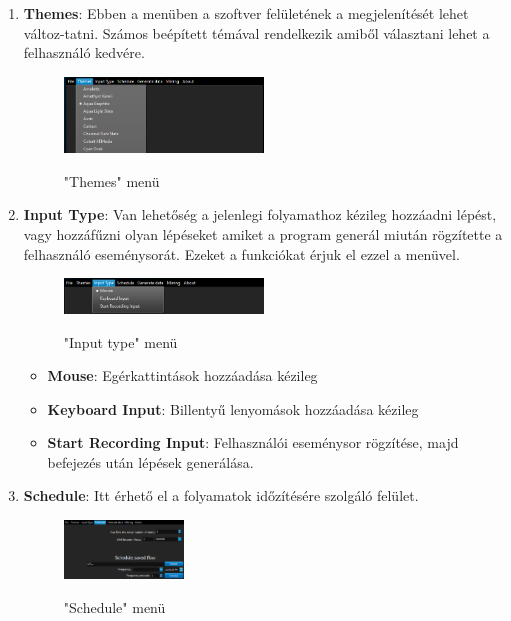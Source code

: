 \begin{enumerate}
{	}
	\item{
		\textbf{Themes}: Ebben a menüben a szoftver felületének a megjelenítését lehet változ\hyp{}tatni. Számos beépített témával rendelkezik amiből választani lehet a felhasználó kedvére.
		\begin{figure}[h]
			\begin{center}
				\caption{"Themes" menü}
				\includegraphics[width=0.5\textwidth, keepaspectratio=true]{images/img_ui_themes}\\
				\label{fig:example}
			\end{center}
		\end{figure}
	}
	\item{
		\textbf{Input Type}: Van lehetőség a jelenlegi folyamathoz kézileg hozzáadni lépést, vagy hozzáfűzni olyan lépéseket amiket a program generál miután rögzítette a felhasználó eseménysorát. Ezeket a funkciókat érjuk el ezzel a menüvel.
		\begin{figure}[h]
			\begin{center}
				\caption{"Input type" menü}
				\includegraphics[width=0.5\textwidth, keepaspectratio=true]{images/img_ui_input}\\
				\label{fig:example}
			\end{center}
		\end{figure}
		\begin{itemize}
			\item{\textbf{Mouse}: Egérkattintások hozzáadása kézileg}
			\item{\textbf{Keyboard Input}: Billentyű lenyomások hozzáadása kézileg}
			\item{\textbf{Start Recording Input}: Felhasználói eseménysor rögzítése, majd befejezés után lépések generálása.}
		\end{itemize}
	}
	\item{
		\textbf{Schedule}: Itt érhető el a folyamatok időzítésére szolgáló felület.
		\begin{figure}[h!]
			\begin{center}
				\caption{"Schedule" menü}
				\includegraphics[width=0.3\textwidth, keepaspectratio=true]{images/img_ui_schedule}\\

\end{center}
\end{figure}}
\end{enumerate}
